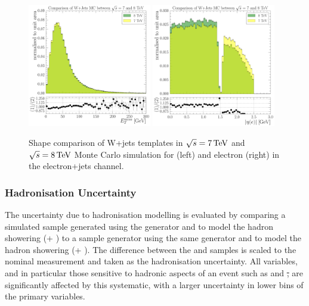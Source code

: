 \begin{figure}[hbtp]
    \centering
     \includegraphics[width=0.48\textwidth]{Chapters/04_Analysis/04b_XSections/images/WJets_comparison/TTbar_plus_X_analysis_EPlusJets_Refselection_MET_patType1CorrectedPFMet_MET_0orMoreBtag.pdf}\hfill
     \includegraphics[width=0.48\textwidth]{Chapters/04_Analysis/04b_XSections/images/WJets_comparison/TTbar_plus_X_analysis_EPlusJets_Refselection_Electron_electron_AbsEta_0orMoreBtag.pdf}\\
	 \caption[\met and electron \abseta shape comparison of W+jets templates in $\roots=7\TeV$ and
	 $\roots=8\TeV$ in the electron+jets channel.]{Shape comparison of W+jets templates in $\roots=7\TeV$ and
	 $\roots=8\TeV$ Monte Carlo simulation for \met (left) and electron \abseta (right) in the electron+jets
	 channel.}
     \label{fig:wjets_7TeV_8TeV_comparison}
\end{figure}

\subsubsection{Hadronisation Uncertainty}
\label{sss:hadronisation_uncertainty}
The uncertainty due to hadronisation modelling is evaluated by comparing a simulated sample
generated using the \POWHEG generator and \PYTHIA to model the hadron showering (\POWHEG+ \PYTHIA) to a sample
generator using the same \POWHEG generator and \HERWIG to model the hadron showering (\POWHEG+ \HERWIG). The
difference between the \PYTHIA and \HERWIG samples is scaled to the nominal measurement and taken as the
hadronisation uncertainty. All variables, and in particular those sensitive to hadronic aspects of an event
such as \HT and \st, are significantly affected by this systematic, with a larger uncertainty in lower bins of
the primary variables.


